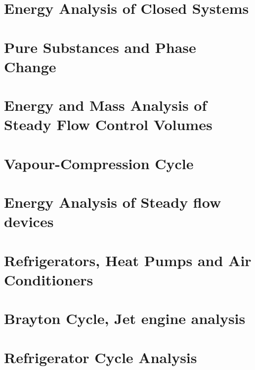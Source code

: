 \documentclass[12pt,a4paper]{article}
\begin{document}
\newpage

\section{Energy Analysis of Closed Systems}

\newpage

\section{Pure Substances and Phase Change}

\newpage

\section{Energy and Mass Analysis of Steady Flow Control Volumes}

\newpage

\section{Vapour-Compression Cycle}

\newpage

\section{Energy Analysis of Steady flow devices}

\newpage

\section{Refrigerators, Heat Pumps and Air Conditioners}

\newpage

\section{Brayton Cycle, Jet engine analysis}

\newpage

\section{Refrigerator Cycle Analysis}
\end{document}
